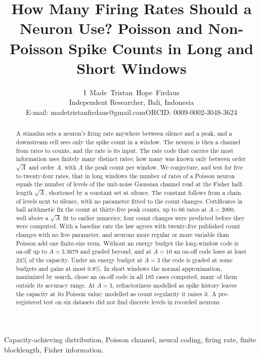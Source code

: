 \documentclass[journal]{IEEEtran}
\begin{document}
\title{How Many Firing Rates Should a Neuron Use? Poisson and Non-Poisson Spike Counts in Long and Short Windows}
\author{I~Made~Tristan~Hope~Firdaus\\
{\normalsize Independent Researcher, Bali, Indonesia}\\
{\normalsize E-mail: madetristanfirdaus@gmail.com\quad ORCID: 0009-0002-3048-3624}}
\maketitle

\begin{abstract}
A stimulus sets a neuron's firing rate anywhere between silence and a peak, and a downstream cell sees only the spike count in a window.
The neuron is then a channel from rates to counts, and the rate is its input. The rate code that carries the most information uses finitely many distinct
rates; how many was known only between order $\sqrt A$ and order $A$, with $A$ the peak count per window. We conjecture, and test
for five to twenty-four rates, that in long windows the number of rates of a Poisson neuron equals the number of levels of the
unit-noise Gaussian channel read at the Fisher half-length $\sqrt A$, shortened by a constant set at silence. The constant follows from
a chain of levels next to silence, with no parameter fitted to the count changes. Certificates in ball arithmetic fix the count at
thirty-five peak counts, up to 66 rates at $A = 2000$, well above a $\sqrt A$ fit to earlier numerics; four count changes were predicted
before they were computed. With a baseline rate the law agrees with twenty-five published count changes with no free parameter, and
neurons more regular or more variable than Poisson add one finite-size term. Without an energy budget the long-window code is on-off up
to $A = 3.3679$ and graded beyond, and at $A = 10$ an on-off code loses at least 24\% of the capacity. Under an energy budget at $A = 3$
the code is graded at some budgets and gains at most 0.8\%. In short windows the normal approximation, maximized by search, chose an
on-off code in all 185 cases computed, many of them outside its accuracy range. At $A = 3$, refractoriness modelled as spike history
leaves the capacity at its Poisson value; modelled as count regularity it raises it. A pre-registered test on six datasets did not find
discrete levels in recorded neurons.
\end{abstract}

\begin{IEEEkeywords}
Capacity-achieving distribution, Poisson channel, neural coding, firing rate, finite blocklength, Fisher information.
\end{IEEEkeywords}
\end{document}
